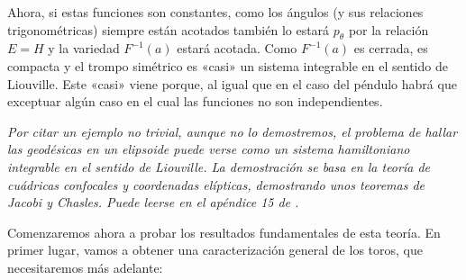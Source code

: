 \begin{ejemplo}
  Ahora, si estas funciones son constantes, como los ángulos (y sus relaciones trigonométricas) siempre están acotados también lo estará $p_{\theta}$ por la relación $E=H$ y la variedad $F^{-1}(a)$ estará acotada. Como $F^{-1}(a)$ es cerrada, es compacta y el trompo simétrico es «casi» un sistema integrable en el sentido de Liouville. Este «casi» viene porque, al igual que en el caso del péndulo habrá que exceptuar algún caso en el cual las funciones no son independientes.
\end{ejemplo}

\begin{ejemplo}
  \em
  Por citar un ejemplo no trivial, aunque no lo demostremos, el problema de hallar las geodésicas en un elipsoide puede verse como un sistema hamiltoniano integrable en el sentido de Liouville. La demostración se basa en la teoría de cuádricas confocales y coordenadas elípticas, demostrando unos teoremas de Jacobi y Chasles. Puede leerse en el apéndice 15 de \cite{arnold}.
\end{ejemplo}

Comenzaremos ahora a probar los resultados fundamentales de esta teoría. En primer lugar, vamos a obtener una caracterización general de los toros, que necesitaremos más adelante:

